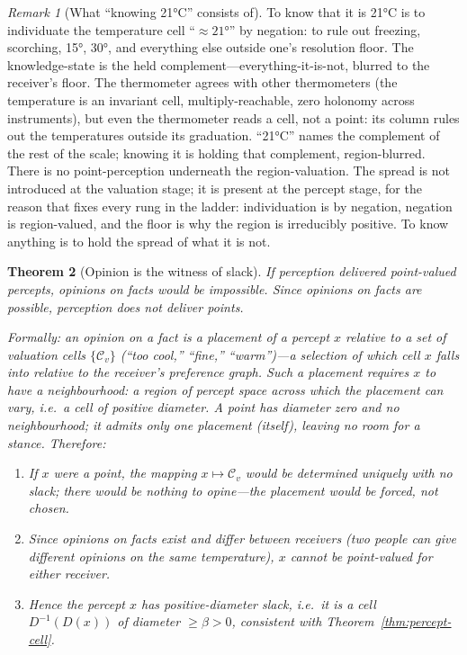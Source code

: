 \documentclass[twocolumn,11pt,a4paper]{article}
\theoremstyle{adv}
\newtheorem{theorem}{Theorem}[section]
\theoremstyle{definition}
\theoremstyle{remark}
\newtheorem{remark}[theorem]{Remark}
\newcommand{\Cell}{\mathcal{C}}        %
\newcommand{\Dec}{D}                   %
\newcommand{\floor}{\beta}            %
\begin{document}
\begin{remark}[What ``knowing 21°C'' consists of]
To know that it is 21°C is to individuate the temperature cell
``$\approx21°$'' by negation: to rule out freezing, scorching, 15°, 30°,
and everything else outside one's resolution floor. The knowledge-state is
the held complement---everything-it-is-not, blurred to the receiver's floor.
The thermometer agrees with other thermometers (the temperature is an
invariant cell, multiply-reachable, zero holonomy across instruments), but
even the thermometer reads a cell, not a point: its column rules out
the temperatures outside its graduation. ``21°C'' names the complement
of the rest of the scale; knowing it is holding that complement, region-blurred.
There is no point-perception underneath the region-valuation. The spread is
not introduced at the valuation stage; it is present at the percept stage,
for the reason that fixes every rung in the ladder: individuation is by
negation, negation is region-valued, and the floor is why the region is
irreducibly positive. To know anything is to hold the spread of what it is
not.
\end{remark}

\begin{theorem}[Opinion is the witness of slack]
\label{thm:opinion-slack}
If perception delivered point-valued percepts, opinions on facts would be
impossible. Since opinions on facts are possible, perception does not deliver
points.

Formally: an \emph{opinion on a fact} is a placement of a percept $x$
relative to a set of valuation cells $\{\Cell_v\}$ (``too cool,'' ``fine,''
``warm'')---a selection of which cell $x$ falls into relative to the
receiver's preference graph. Such a placement requires $x$ to have a
neighbourhood: a region of percept space across which the placement can
vary, i.e.\ a cell of positive diameter. A point has diameter zero and no
neighbourhood; it admits only one placement (itself), leaving no room for a
stance. Therefore:
\begin{enumerate}[label=\textup{(\roman*)},leftmargin=2.2em]
\item If $x$ were a point, the mapping $x \mapsto \Cell_v$ would be
      determined uniquely with no slack; there would be nothing to opine---the
      placement would be forced, not chosen.
\item Since opinions on facts exist and differ between receivers (two people
      can give different opinions on the same temperature), $x$ cannot be
      point-valued for either receiver.
\item Hence the percept $x$ has positive-diameter slack, i.e.\ it is a cell
      $\Dec^{-1}(\Dec(x))$ of diameter $\ge\floor>0$, consistent with
      Theorem~\ref{thm:percept-cell}.
\end{enumerate}
\end{theorem}
\end{document}
